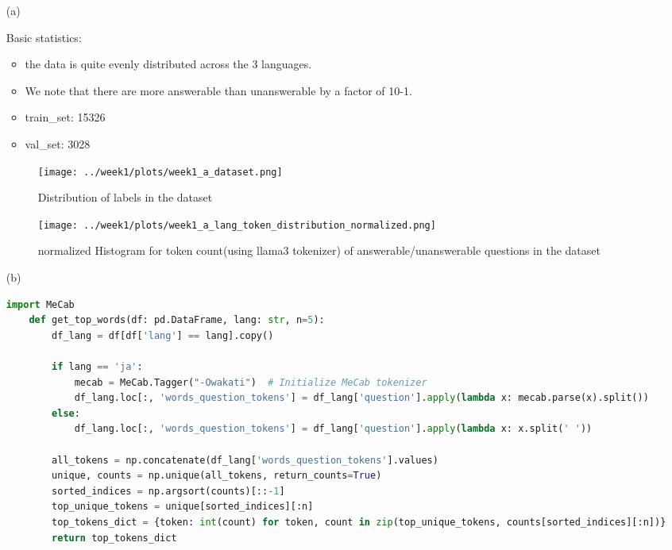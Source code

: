 \documentclass{article}
\begin{document}
\begin{enumerate}
    \item[(a)] 

    Basic statistics:
    \begin{itemize}
        \item the data is quite evenly distributed across the 3 languages.
        \item We note that there are more answerable than unanswerable by a factor of 10-1.
        \item train\_set: 15326
        \item val\_set: 3028
    \end{itemize}

    \begin{figure}[h]
        \centering
        \texttt{[image: ../week1/plots/week1\_a\_dataset.png]}
        \caption{Distribution of labels in the dataset}
        \label{fig:label_distribution}
    \end{figure}

    \begin{figure}[h]
        \centering
        \texttt{[image: ../week1/plots/week1\_a\_lang\_token\_distribution\_normalized.png]}
        \caption{normalized Histogram for token count(using llama3 tokenizer) of answerable/unanswerable questions in the dataset}
        \label{fig:language_distribution}
    \end{figure}

    \item[(b)] 

    \begin{lstlisting}[language=Python]
    import MeCab
    def get_top_words(df: pd.DataFrame, lang: str, n=5):
        df_lang = df[df['lang'] == lang].copy()
        
        if lang == 'ja':
            mecab = MeCab.Tagger("-Owakati")  # Initialize MeCab tokenizer
            df_lang.loc[:, 'words_question_tokens'] = df_lang['question'].apply(lambda x: mecab.parse(x).split())
        else:
            df_lang.loc[:, 'words_question_tokens'] = df_lang['question'].apply(lambda x: x.split(' '))
        
        all_tokens = np.concatenate(df_lang['words_question_tokens'].values)
        unique, counts = np.unique(all_tokens, return_counts=True)
        sorted_indices = np.argsort(counts)[::-1]
        top_unique_tokens = unique[sorted_indices][:n]
        top_tokens_dict = {token: int(count) for token, count in zip(top_unique_tokens, counts[sorted_indices][:n])}
        return top_tokens_dict
    \end{lstlisting}



\end{enumerate}
\end{document}
